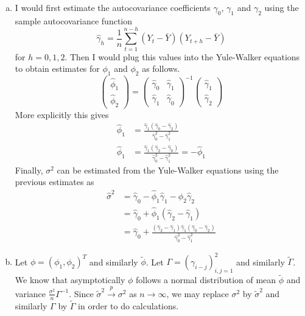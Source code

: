 \documentclass{article}
\theoremstyle{plain}
\theoremstyle{definition}
\newenvironment{exercise}[1]
  {\renewcommand\theexerciseaux{#1}\exerciseaux\label{ejer:#1}}
  {\endexerciseaux}
\newenvironment{sol}{\begin{trivlist}
 \item[\hskip \labelsep {\textit{Solution}.}\hskip \labelsep]}{\end{trivlist}}
\begin{document}
\begin{exercise}{1}
\end{exercise}
\begin{sol}
\begin{enumerate}[(a)]
\item 
I would first estimate the autocovariance coefficients $\gamma_0$, $\gamma_1$ and $\gamma_2$ using the sample autocovariance function
\[
\hat{\gamma}_h= \frac{1}{n}\sum_{t=1}^{n-h}(Y_t -\bar{Y})(Y_{t+h}-\bar{Y})
\]
for $h=0,1,2$. Then I would plug this values into the Yule-Walker equations to obtain estimates for $\phi_1$ and $\phi_2$ as follows.
\[
\begin{pmatrix}
\hat{\phi}_1\\
\hat{\phi}_2
\end{pmatrix}=\begin{pmatrix}
\hat{\gamma}_0 & \hat{\gamma}_1\\
\hat{\gamma}_1 & \hat{\gamma}_0
\end{pmatrix}^{-1}\begin{pmatrix}
\hat{\gamma}_1\\
\hat{\gamma}_2
\end{pmatrix}
\]
More explicitly this gives
\begin{align*}
\hat{\phi}_1 & =\frac{\hat{\gamma}_1(\hat{\gamma}_0-\hat{\gamma}_2)}{\hat{\gamma}_0^2-\hat{\gamma}_1^2}\\
\hat{\phi}_1 & = \frac{\hat{\gamma}_1(\hat{\gamma}_2-\hat{\gamma}_0)}{\hat{\gamma}_0^2-\hat{\gamma}_1^2}=-\hat{\phi}_1
\end{align*}
Finally, $\sigma^2$ can be estimated from the Yule-Walker equations using the previous estimates as 
\begin{align*}
\hat{\sigma}^2 &= \hat{\gamma}_0 -\hat{\phi}_1\hat{\gamma}_1 - \hat{\phi}_2\hat{\gamma}_2\\
 & =  \hat{\gamma}_0 +\hat{\phi}_1(\hat{\gamma}_2 - \hat{\gamma}_1)\\
 & = \hat{\gamma}_0 +\frac{(\hat{\gamma}_2 - \hat{\gamma}_1)\hat{\gamma}_1(\hat{\gamma}_0-\hat{\gamma}_2)}{\hat{\gamma}_0^2-\hat{\gamma}_1^2}
\end{align*}

\item Let $\phi = (\phi_1,\phi_2)^T$ and similarly $\tilde{\phi}$. Let $\Gamma = (\gamma_{i-j})_{i,j=1}^2$ and similarly $\tilde{\Gamma}$. We know that asymptotically $\phi$ follows a normal distribution of mean $\tilde{\phi}$ and variance $\frac{\sigma^2}{n}\Gamma^{-1}$. Since $\tilde{\sigma}^2\xrightarrow{p}\sigma^2$ as $n\to\infty$, we may replace $\sigma^2$ by $\tilde{\sigma}^2$ and similarly $\Gamma$ by $\tilde{\Gamma}$ in order to do calculations. 


\end{enumerate}
\end{sol}
\end{document}
